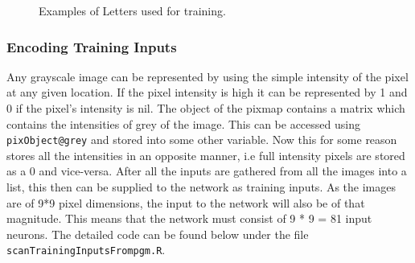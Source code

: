 \documentclass[a4paper,12pt]{report}
\begin{document}
\begin{figure}
\begin{subfigure}[h!]{0.3\textwidth}
        \end{subfigure}
        \caption{Examples of Letters used for training.}
\end{figure}

\subsubsection*{Encoding Training Inputs}
Any grayscale image can be represented by using the simple intensity of the pixel at any given location. If the pixel intensity is high 
it can be represented by 1 and 0 if the pixel's intensity is nil. The object of the pixmap contains a matrix which contains the intensities of grey
of the image. This can be accessed using \verb+pixObject@grey+ and stored into some other variable.
Now this for some reason stores all the intensities in an opposite manner, i.e full intensity pixels are stored as a 0 and vice-versa.
After all the inputs are gathered from all the images into a list, this then can be supplied to the network as training inputs. As the images
are of 9*9 pixel dimensions, the input to the network will also be of that magnitude. This means that the network must consist of 
9 * 9 = 81 input neurons. The detailed code can be found below under the file \verb+scanTrainingInputsFrompgm.R+.
\end{document}

